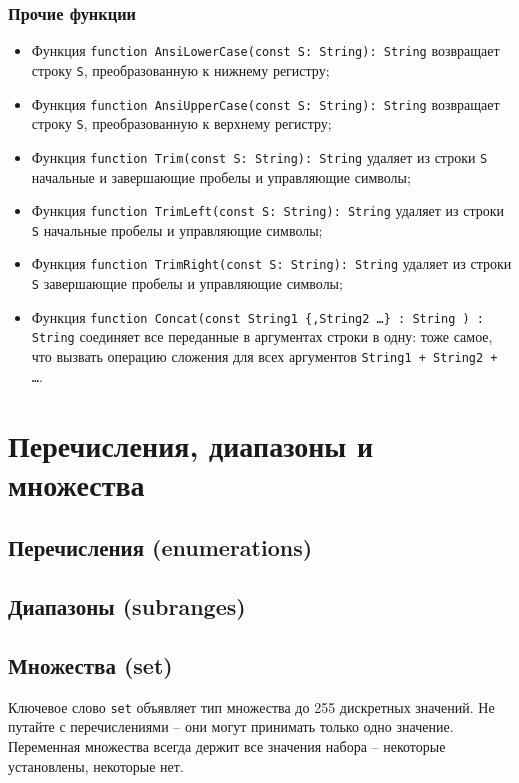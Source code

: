 \documentclass[12pt,a4paper]{report}
\begin{document}
\subsubsection*{Прочие функции}
\begin{itemize}
\item Функция \texttt{function AnsiLowerCase(const S: String): String} возвращает строку \texttt{S}, преобразованную к нижнему регистру;
\item Функция \texttt{function AnsiUpperCase(const S: String): String} возвращает строку \texttt{S}, преобразованную к верхнему регистру;
\item Функция \texttt{function Trim(const S: String): String} удаляет из строки \texttt{S} начальные и завершающие пробелы и управляющие символы;
\item Функция \texttt{function TrimLeft(const S: String): String} удаляет из строки \texttt{S} начальные пробелы и управляющие символы;
\item Функция \texttt{function TrimRight(const S: String): String} удаляет из строки \texttt{S} завершающие пробелы и управляющие символы;
\item Функция \texttt{function Concat(const String1 \{,String2 \ldots\} : String ) : String} соединяет все переданные в аргументах строки в одну: тоже самое, что вызвать операцию сложения для всех аргументов \texttt{String1 + String2 + \ldots}.
\end{itemize}

\clearpage
\section*{Перечисления, диапазоны и множества}
\subsection*{Перечисления (enumerations)}
\subsection*{Диапазоны (subranges)}
\subsection*{Множества (set)}

Ключевое слово \texttt{set} объявляет тип множества до 255 дискретных значений. Не путайте с перечислениями -- они могут принимать только одно значение. Переменная множества всегда держит все значения набора -- некоторые установлены, некоторые нет. 
\end{document}
